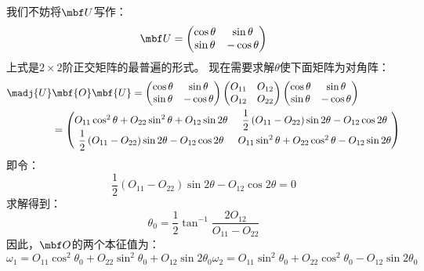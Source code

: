我们不妨将$\mbf U$写作：
\begin{equation}
 \mbf U = \begin{pmatrix}
     \cos{\theta} &\sin\theta \\ \sin\theta &-\cos\theta
 \end{pmatrix}
 \label{eq:1.104}
\end{equation}
上式是$2\times2$阶正交矩阵的最普遍的形式。
现在需要求解$\theta$使下面矩阵为对角阵：
\[
\begin{split}
 \madj{U}&\mbf{O}\mbf{U} = \begin{pmatrix}
     \cos\theta &\sin\theta \\ \sin\theta &-\cos\theta
 \end{pmatrix} \begin{pmatrix}
     O_{11} & O_{12} \\ O_{12} & O_{22}
 \end{pmatrix} \begin{pmatrix}
     \cos\theta &\sin\theta \\ \sin\theta &-\cos\theta
 \end{pmatrix} \\
 &= \begin{pmatrix}
     O_{11}\cos^2\theta + O_{22}\sin^2\theta + O_{12}\sin{2\theta} 
     &\displaystyle\frac{1}{2}\left(O_{11}-O_{22}\right)\sin{2\theta}-O_{12}\cos{2\theta} \\
     \displaystyle\frac{1}{2}\left(O_{11}-O_{22}\right)\sin{2\theta}-O_{12}\cos{2\theta} 
     &O_{11}\sin^2\theta +O_{22}\cos^2\theta-O_{12}\sin{2\theta}
 \end{pmatrix}
\end{split}
\]
即令：
\[
\frac{1}{2}\left(O_{11}-O_{22}\right)\sin{2\theta} - O_{12}\cos{2\theta} = 0
\]
求解得到：
\begin{equation}
 \theta_0 = \frac{1}{2}\tan^{-1}\frac{2O_{12}}{O_{11}-O_{22}}
 \label{eq:1.105}
\end{equation}
因此，$\mbf O$的两个本征值为：
\begin{subequations}
 \begin{equation}
     \omega_1 = O_{11}\cos^2\theta_0 + O_{22}\sin^2\theta_0 + O_{12}\sin{2\theta_0}
     \label{eq:1.106a}
 \end{equation}
 \begin{equation}
     \omega_2 = O_{11}\sin^2\theta_0 + O_{22}\cos^2\theta_0 - O_{12}\sin{2\theta_0}
     \label{eq:1.106b}
 \end{equation}
 \label{eq:1.106}
\end{subequations}
